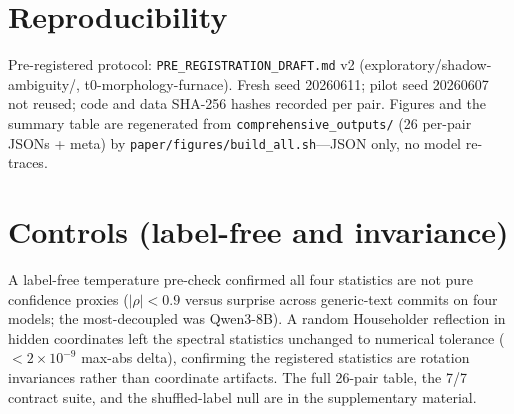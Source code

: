 \documentclass[10pt, letterpaper]{article}
\begin{document}
\section{Reproducibility}
\label{app:repro}
Pre-registered protocol: \texttt{PRE\_REGISTRATION\_DRAFT.md} v2
(exploratory/shadow-ambiguity/, t0-morphology-furnace). Fresh seed
20260611; pilot seed 20260607 not reused; code and data SHA-256 hashes
recorded per pair. Figures and the summary table are regenerated from
\texttt{comprehensive\_outputs/} (26 per-pair JSONs + meta) by
\texttt{paper/figures/build\_all.sh}---JSON only, no model re-traces.

\section{Controls (label-free and invariance)}
\label{app:controls}
A label-free temperature pre-check confirmed all four statistics are
not pure confidence proxies ($|\rho|<0.9$ versus surprise across
generic-text commits on four models; the most-decoupled was Qwen3-8B).
A random Householder reflection in hidden coordinates left the spectral
statistics unchanged to numerical tolerance ($<2\times10^{-9}$
max-abs delta), confirming the registered statistics are rotation
invariances rather than coordinate artifacts. The full 26-pair table,
the 7/7 contract suite, and the shuffled-label null are in the
supplementary material.
\end{document}

